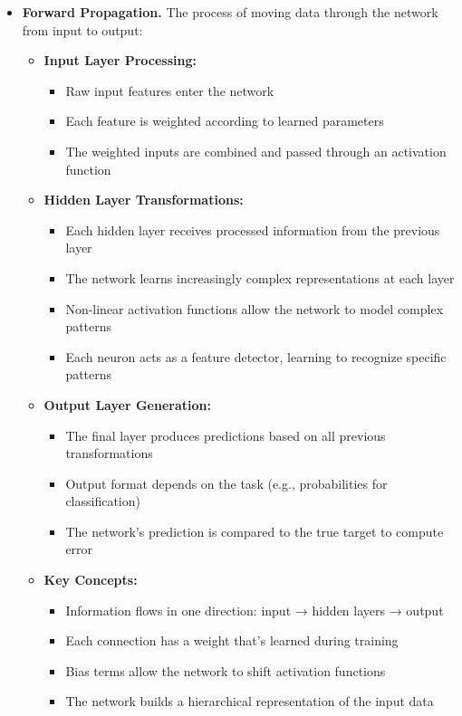 \begin{itemize}
    \item \textbf{Forward Propagation.} The process of moving data through the network from input to output:
    
    \begin{itemize}
        \item \textbf{Input Layer Processing:}
            \begin{itemize}
                \item Raw input features enter the network
                \item Each feature is weighted according to learned parameters
                \item The weighted inputs are combined and passed through an activation function
            \end{itemize}
            
        \item \textbf{Hidden Layer Transformations:}
            \begin{itemize}
                \item Each hidden layer receives processed information from the previous layer
                \item The network learns increasingly complex representations at each layer
                \item Non-linear activation functions allow the network to model complex patterns
                \item Each neuron acts as a feature detector, learning to recognize specific patterns
            \end{itemize}
            
        \item \textbf{Output Layer Generation:}
            \begin{itemize}
                \item The final layer produces predictions based on all previous transformations
                \item Output format depends on the task (e.g., probabilities for classification)
                \item The network's prediction is compared to the true target to compute error
            \end{itemize}
            
        \item \textbf{Key Concepts:}
            \begin{itemize}
                \item Information flows in one direction: input → hidden layers → output
                \item Each connection has a weight that's learned during training
                \item Bias terms allow the network to shift activation functions
                \item The network builds a hierarchical representation of the input data
            \end{itemize}
    \end{itemize}
    

\end{itemize}
